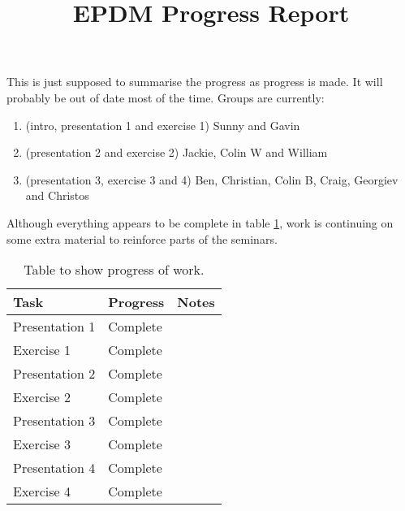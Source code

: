 \documentclass[11pt]{article}
\title{EPDM Progress Report}
\author{}
\begin{document}
\maketitle

This is just supposed to summarise the progress as progress is made.
It will probably be out of date most of the time.
Groups are currently:
\begin{enumerate}
\item (intro, presentation 1 and exercise 1) Sunny and Gavin
\item (presentation 2 and exercise 2) Jackie, Colin W and William
\item (presentation 3, exercise 3 and 4) Ben, Christian, Colin B, Craig, Georgiev and Christos
\end{enumerate}

Although everything appears to be complete in table \ref{table1}, work is continuing on some extra material to reinforce parts of the seminars.

\begin{table}
\begin{center}
\begin{tabular}{l l p{}}
Task & Progress & Notes \\
\hline
Presentation 1 & Complete &  \\
Exercise 1 & Complete &  \\
Presentation 2 & Complete & \\ 
Exercise 2 & Complete &  \\
Presentation 3 & Complete &  \\
Exercise 3  &  Complete & \\
Presentation 4 & Complete &  \\
Exercise 4 & Complete & \\ 
\end{tabular}
\end{center}
\caption{Table to show progress of work.}
\label{table1}
\end{table}
\end{document}
